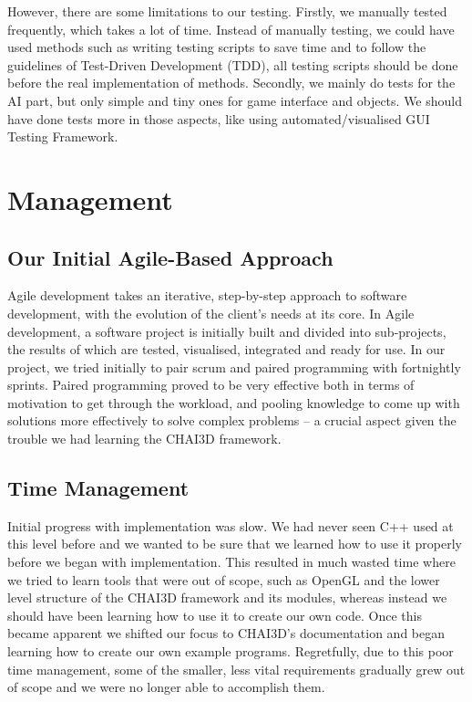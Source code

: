 \documentclass[a4paper]{article}
\begin{document}
\vspace{5mm}
\noindent However, there are some limitations to our testing. Firstly, we manually tested frequently, which takes a lot of time. Instead of manually testing, we could have used methods such as writing testing scripts to save time and to follow the guidelines of Test-Driven Development (TDD), all testing scripts should be done before the real implementation of methods. Secondly, we mainly do tests for the AI part, but only simple and tiny ones for game interface and objects. We should have done tests more in those aspects, like using automated/visualised GUI Testing Framework.

\section{Management}
\subsection{Our Initial Agile-Based Approach}
Agile development takes an iterative, step-by-step approach to software development, with the evolution of the client’s needs at its core. In Agile development, a software project is initially built and divided into sub-projects, the results of which are tested, visualised, integrated and ready for use. In our project, we tried initially to pair scrum and paired programming with fortnightly sprints. Paired programming proved to be very effective both in terms of motivation to get through the workload, and pooling knowledge to come up with solutions more effectively to solve complex problems – a crucial aspect given the trouble we had learning the CHAI3D framework. 

\subsection{Time Management}
Initial progress with implementation was slow. We had never seen C++ used at this level before and we wanted to be sure that we learned how to use it properly before we began with implementation. This resulted in much wasted time where we tried to learn tools that were out of scope, such as OpenGL and the lower level structure of the CHAI3D framework and its modules, whereas instead we should have been learning how to use it to create our own code. Once this became apparent we shifted our focus to CHAI3D’s documentation and began learning how to create our own example programs. Regretfully, due to this poor time management, some of the smaller, less vital requirements gradually grew out of scope and we were no longer able to accomplish them. 
\end{document}
